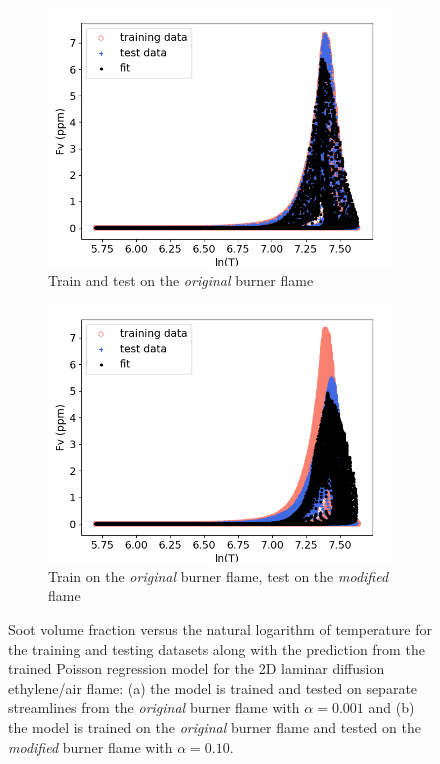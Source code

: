 \documentclass[12pt]{CHT-20}
\begin{document}
\begin{figure}[H]
     \centering 
     \begin{subfigure}[b]{0.49\textwidth}
         \centering
         \includegraphics[width=\textwidth]{figures/machLearning/trainSantoro_testSantoro_alpha0.001._deg2.png}
         \caption{Train and test on the \emph{original} burner flame}
     \end{subfigure}
     \hfill
     \begin{subfigure}[b]{0.49\textwidth}
         \centering
         \includegraphics[width=\textwidth]{figures/machLearning/trainSantoro_testFM_alpha0.1._deg2.png}
         \caption{Train on the \emph{original} burner flame, test on the \emph{modified} flame}
     \end{subfigure}
        \caption{Soot volume fraction versus the natural logarithm of temperature for the training and testing datasets along with the prediction from the trained Poisson regression model for the 2D laminar diffusion ethylene/air flame: (a) the model is trained and tested on separate streamlines from the \emph{original} burner flame with $\alpha=0.001$ and (b) the model is trained on the \emph{original} burner flame and tested on the \emph{modified} burner flame with $\alpha=0.10$.}
        \label{fig:2D_soot_v_lnT_scatterPlots}
\end{figure}
\end{document}
